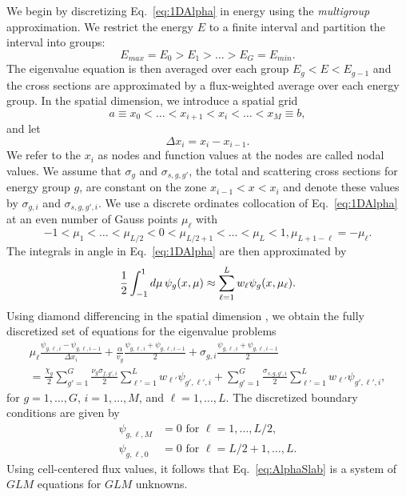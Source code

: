 We begin by discretizing Eq.~\ref{eq:1DAlpha} in energy using the \textit{multigroup} approximation. We restrict the energy $E$ to a finite interval and partition the interval into groups:
\begin{equation}
	E_{max} = E_{0} > E_{1} > \dots > E_{G} = E_{min}.
\end{equation}
The eigenvalue equation is then averaged over each group $E_{g} < E < E_{g-1}$ and the cross sections are approximated by a flux-weighted average over each energy group. In the spatial dimension, we introduce a spatial grid
\begin{equation}
	a \equiv x_{0} < \dots < x_{i+1} < x_{i} < \dots < x_{M} \equiv b,
\end{equation}
and let 
\begin{equation}
\Delta x_{i} = x_{i} - x_{i-1}.
\end{equation} 
We refer to the $x_{i}$ as nodes and function values at the nodes are called nodal values. We assume that $\sigma_{g}$ and $\sigma_{s,g,g'}$, the total and scattering cross sections for energy group $g$, are constant on the zone $x_{i-1} < x < x_{i}$ and denote these values by $\sigma_{g,i}$ and $\sigma_{s,g,g',i}$. We use a discrete ordinates collocation of Eq.~\ref{eq:1DAlpha} at an even number of Gauss points $\mu_{\ell}$ with
\begin{equation}
	-1 < \mu_{1} < \dots < \mu_{L/2} < 0 < \mu_{L/2+1} < \dots < \mu_{L} < 1, \mu_{L+1-\ell} = - \mu_{\ell}.
\end{equation}
The integrals in angle in Eq.~\ref{eq:1DAlpha} are then approximated by
\begin{equation}
	\frac{1}{2} \int_{-1}^{1} \mathop{}\!d \mu \, \psi_{g}(x, \mu) \approx \sum_{\ell=1}^{L} w_{\ell} \psi_{g}(x, \mu_{\ell}).
\end{equation}
Using diamond differencing in the spatial dimension \cite{lewis_computational_1984}, we obtain the fully discretized set of equations for the eigenvalue problems
\begin{multline}
	\mu_{\ell} \frac{ \psi_{g,\ell,i} - \psi_{g, \ell, i-1}}{\Delta x_{i}} + \frac{\alpha}{v_{g}} \frac{\psi_{g,\ell,i} + \psi_{g, \ell, i-1}}{2} + \sigma_{g,i} \frac{\psi_{g,\ell,i} + \psi_{g, \ell, i-1}}{2} \\ = \frac{\chi_{g}}{2} \sum_{g'=1}^{G} \frac{\nu_{g}\sigma_{f,g',i}}{2} \sum_{\ell' = 1}^{L} w_{\ell'} \psi_{g',\ell',i} + \sum_{g'=1}^{G} \frac{\sigma_{s,g,g',i}}{2} \sum_{\ell' = 1}^{L} w_{\ell'} \psi_{g',\ell',i},
\label{eq:AlphaSlab}
\end{multline}
for $g = 1, \dots, G$, $i = 1, \dots, M$, and $\ell = 1, \dots, L$. The discretized boundary conditions are given by
\begin{align}
\psi_{g,\ell,M} &= 0 \text{ for } \ell = 1, \dots, L/2,  \\
\psi_{g,\ell,0} &= 0 \text{ for } \ell = L/2+1, \dots, L.
\end{align}
Using cell-centered flux values, it follows that Eq.~\ref{eq:AlphaSlab} is a system of $GLM$ equations for $GLM$ unknowns. 

